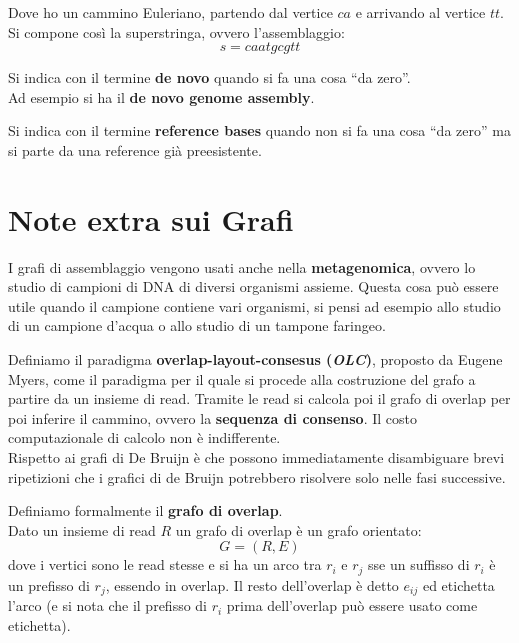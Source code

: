 \documentclass[a4paper,12pt, oneside]{book}
\begin{document}
\begin{esempio}
\begin{figure}[H]
  \end{figure}
  Dove ho un cammino Euleriano, partendo dal vertice $ca$ e arrivando al vertice
  $tt$. Si compone così la superstringa, ovvero l'assemblaggio: 
  \[s=caatgcgtt\]
\end{esempio}
\begin{definizione}
  Si indica con il termine \textbf{de novo} quando si fa una cosa ``da zero''.\\
  Ad esempio si ha il \textbf{de novo genome assembly}.
\end{definizione}
\begin{definizione}
  Si indica con il termine \textbf{reference bases} quando non si fa una cosa
  ``da zero'' ma si parte da una reference già preesistente. 
\end{definizione}
\section{Note extra sui Grafi}
I grafi di assemblaggio vengono usati anche nella \textbf{metagenomica}, ovvero
lo studio di campioni di DNA di diversi organismi assieme. Questa cosa può
essere utile quando il campione contiene vari organismi, si pensi ad esempio
allo studio di un campione d'acqua o allo studio di un tampone faringeo.\\
\begin{definizione}
  Definiamo il paradigma \textbf{overlap-layout-consesus (\textit{OLC})},
  proposto da Eugene Myers, come il
  paradigma per il quale si procede alla costruzione del grafo a partire da un
  insieme di read. Tramite le read si calcola poi il grafo di overlap per poi
  inferire il cammino, ovvero la \textbf{sequenza di consenso}. Il costo
  computazionale di calcolo non è indifferente.\\
  Rispetto ai grafi di De Bruijn è che possono immediatamente disambiguare brevi
  ripetizioni che i grafici di de Bruijn potrebbero risolvere solo nelle fasi
  successive.
\end{definizione}
\begin{definizione}
  Definiamo formalmente il \textbf{grafo di overlap}.\\
  Dato un insieme di read $R$ un grafo di overlap è un grafo orientato:
  \[G=(R,E)\]
  dove i vertici sono le read stesse e si ha un arco tra $r_i$ e $r_j$ sse un
  suffisso di $r_i$ è un prefisso di $r_j$, essendo in overlap. Il resto
  dell'overlap è detto $e_{ij}$ ed etichetta l'arco (e si nota che il prefisso
  di $r_i$ prima dell'overlap può essere usato come etichetta).
  
\end{definizione}
\end{document}
